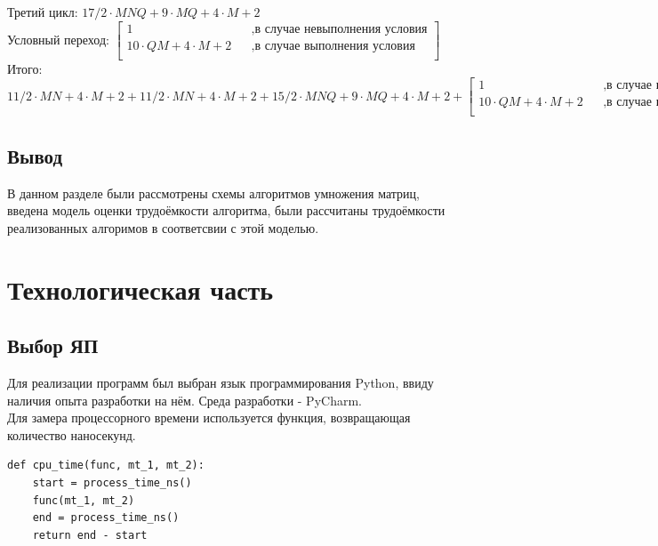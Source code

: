 \documentclass[12pt]{report}
\begin{document}
Третий цикл: $17/2 \cdot M  N Q + 9 \cdot M Q + 4 \cdot M + 2$\\

Условный переход: $\begin{bmatrix}
             1    &&, \text{в случае невыполнения условия}\\
             10 \cdot QM + 4 \cdot M + 2 &&, \text{в случае выполнения условия}\\
           \end{bmatrix} $ \\

Итого: $11/2 \cdot M  N + 4 \cdot M + 2 + 11/2 \cdot M  N + 4 \cdot M + 2 + 15/2 \cdot M  N Q + 9 \cdot M Q + 4 \cdot M + 2 +
       \begin{bmatrix}
             1    &&, \text{в случае невыполнения условия}\\
             10 \cdot QM + 4 \cdot M + 2 &&, \text{в случае выполнения условия}\\
           \end{bmatrix} $ \\

\section{Вывод}
В данном разделе были рассмотрены схемы алгоритмов умножения матриц, введена модель оценки
трудоёмкости алгоритма, были рассчитаны трудоёмкости реализованных алгоримов в соответсвии 
с этой моделью.

\chapter{Технологическая часть}
\section{Выбор ЯП}
Для реализации программ был выбран язык программирования Python, ввиду наличия опыта разработки на нём. Среда разработки - PyCharm. \\

Для замера процессорного времени используется функция, возвращающая количество наносекунд.\\

\begin{lstlisting}[label=some-code,caption=Функция получения процессорного времени]
def cpu_time(func, mt_1, mt_2):
	start = process_time_ns()
	func(mt_1, mt_2)
	end = process_time_ns()
	return end - start

\end{lstlisting}
\end{document}
